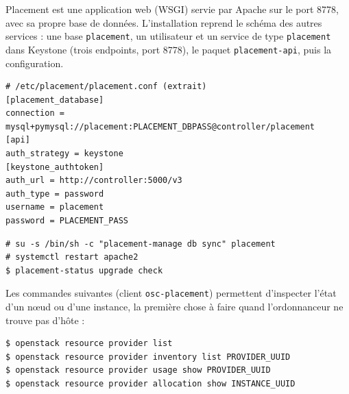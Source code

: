 Placement est une application web (WSGI) servie par Apache sur le port 8778, avec sa propre base de données.
L'installation reprend le schéma des autres services \parencite{placement-install} : une base \texttt{placement},
un utilisateur et un service de type \texttt{placement} dans Keystone (trois endpoints, port 8778), le paquet
\texttt{placement-api}, puis la configuration.

\par\noindent\begin{minipage}{\linewidth}
\begin{lstlisting}
# /etc/placement/placement.conf (extrait)
[placement_database]
connection = mysql+pymysql://placement:PLACEMENT_DBPASS@controller/placement
[api]
auth_strategy = keystone
[keystone_authtoken]
auth_url = http://controller:5000/v3
auth_type = password
username = placement
password = PLACEMENT_PASS
\end{lstlisting}
\end{minipage}\par

\par\noindent\begin{minipage}{\linewidth}
\begin{lstlisting}[style=terminal]
# su -s /bin/sh -c "placement-manage db sync" placement
# systemctl restart apache2
$ placement-status upgrade check
\end{lstlisting}
\end{minipage}\par

Les commandes suivantes (client \texttt{osc-placement}) permettent d'inspecter l'état d'un nœud ou d'une
instance, la première chose à faire quand l'ordonnanceur ne trouve pas d'hôte :

\par\noindent\begin{minipage}{\linewidth}
\begin{lstlisting}[style=terminal]
$ openstack resource provider list
$ openstack resource provider inventory list PROVIDER_UUID
$ openstack resource provider usage show PROVIDER_UUID
$ openstack resource provider allocation show INSTANCE_UUID
\end{lstlisting}
\end{minipage}\par

